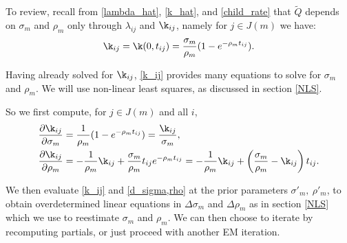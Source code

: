 \documentclass[12pt,leqno]{article}
\begin{document}
To review, recall from \eqref{lambda_hat}, \eqref{k_hat}, and \eqref{child_rate} that $\tilde{Q}$ depends on
$\sigma_m$ and $\rho_m$ only through $\lambda_{ij}$ and $\k_{ij}$, namely for $j\in J(m)$ we have:
\begin{equation}\label{k_ij}
\k_{ij} = \k(0,t_{ij}) = \frac{\sigma_m}{\rho_m}(1 - e^{-\rho_mt_{ij}}).
\end{equation}

Having already solved for $\k_{ij}$, \eqref{k_ij} provides many equations to solve for $\sigma_m$ and $\rho_m$.
We will use non-linear least squares, as discussed in section \ref{NLS}.

So we first compute, for $j\in J(m)$ and all $i$,
\begin{equation}\label{d_sigma,rho}
  \begin{split}
    \frac{\partial\k_{ij}}{\partial\sigma_m} &= \frac{1}{\rho_m}(1 - e^{-\rho_mt_{ij}}) = \frac{\k_{ij}}{\sigma_m},\\
    \frac{\partial\k_{ij}}{\partial\rho_m} &= -\frac{1}{\rho_m}\k_{ij}+\frac{\sigma_m}{\rho_m}t_{ij}e^{-\rho_mt_{ij}}
    = -\frac{1}{\rho_m}\k_{ij} + \left(\frac{\sigma_m}{\rho_m} - \k_{ij}\right)t_{ij}.
  \end{split}
\end{equation}

We then evaluate \eqref{k_ij} and \eqref{d_sigma,rho} at the prior parameters $\sigma'_m,~\rho'_m$, to obtain
overdetermined linear equations in $\Delta\sigma_m$ and $\Delta\rho_m$ as in section \ref{NLS} which we use
to reestimate $\sigma_m$ and $\rho_m$.  We can then choose to iterate by recomputing partials, or just proceed
with another EM iteration.

\end{document}
